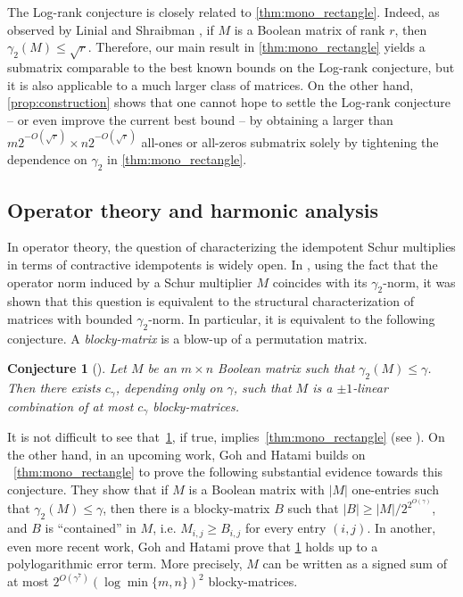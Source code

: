 \documentclass[11pt]{amsart}
\theoremstyle{plain}
\newtheorem{conjecture}[theorem]{Conjecture}
\theoremstyle{definition}
\begin{document}
The Log-rank conjecture is closely related to \cref{thm:mono_rectangle}. Indeed, as observed by Linial and Shraibman \cite{LS}, if $M$ is a Boolean matrix of rank $r$, then $\gamma_2(M)\leq \sqrt{r}$. Therefore, our main result in   \cref{thm:mono_rectangle} yields a submatrix comparable to the best known bounds on the Log-rank conjecture, but it is also applicable to a much larger class of matrices. On the other hand, \cref{prop:construction} shows that one cannot hope to settle the Log-rank conjecture -- or even improve the current best bound -- by obtaining a larger than $m2^{-O(\sqrt{r})}\times n2^{-O(\sqrt{r})}$ all-ones or all-zeros submatrix solely by tightening the dependence on $\gamma_2$ in \cref{thm:mono_rectangle}.

 \subsection{Operator theory and harmonic analysis} In operator theory, the question of characterizing the idempotent Schur multiplies in terms of contractive idempotents is widely open. In \cite{HHH}, using the fact that the operator norm induced by a Schur multiplier 
$M$ coincides with its $\gamma_2$-norm, it was shown that this question is equivalent to the structural characterization of matrices with bounded $\gamma_2$-norm. In particular, it is equivalent to the following conjecture. A \emph{blocky-matrix} is a blow-up of a permutation matrix.
 \begin{conjecture}[\cite{HHH}]\label{conj:blocky}
     Let $M$ be an $m\times n$ Boolean matrix such that $\gamma_2(M)\leq \gamma$. Then there exists  $c_{\gamma}$, depending only on $\gamma$, such that $M$ is a $\pm 1$-linear combination of at most $c_{\gamma}$ blocky-matrices.
 \end{conjecture}
  It is not difficult to see that~\cref{conj:blocky}, if true, implies~\cref{thm:mono_rectangle} (see \cite[Lemma 3.5]{HHH}). On the other hand, in an upcoming work,  Goh and Hatami \cite{GH2} builds on ~\cref{thm:mono_rectangle} to prove the following substantial evidence towards this conjecture. They show that if $M$ is a Boolean matrix with $|M|$ one-entries such that $\gamma_2(M)\leq \gamma$, then there is a blocky-matrix $B$ such that  $|B|\geq |M|/2^{2^{O(\gamma)}}$, and $B$ is ``contained'' in $M$, i.e. $M_{i,j}\geq B_{i,j}$ for every entry $(i,j)$. In another, even more recent work, Goh and Hatami \cite{GH3} prove that \cref{conj:blocky} holds up to a polylogarithmic error term. More precisely, $M$ can be written as a signed sum of at most $2^{O(\gamma^7)}(\log\min\{m,n\})^2$ blocky-matrices.
\end{document}
